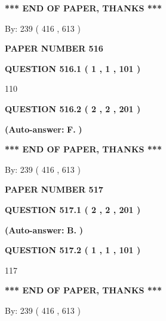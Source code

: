 \documentclass{ctexart}
\begin{document}
 
   
   
   
   
\vspace{1.0in} 
{\textbf{\large{ *** END OF PAPER, THANKS *** }}} 
   
   
\hspace{1.0in} By: 
 239 ( 416 ,  613 )
   
   
   
   
\newpage 
\setcounter{page}{ 
   516001 } 
   
   
 {\textbf{ \Large{ PAPER NUMBER  516  }}}
   
   
   
   
  
  
{\textbf{\large{QUESTION
516.1 
 ( 1 , 1 , 101 )
}}}

110
  
  
{\textbf{\large{QUESTION
516.2 
 ( 2 , 2 , 201 )
}}}
 
 
{\textbf{(Auto-answer:}}
{\textbf{\large{
F.}}}
{\textbf{)}}
 
 
   
   
   
   
\vspace{1.0in} 
{\textbf{\large{ *** END OF PAPER, THANKS *** }}} 
   
   
\hspace{1.0in} By: 
 239 ( 416 ,  613 )
   
   
   
   
\newpage 
\setcounter{page}{ 
   517001 } 
   
   
 {\textbf{ \Large{ PAPER NUMBER  517  }}}
   
   
   
   
  
  
{\textbf{\large{QUESTION
517.1 
 ( 2 , 2 , 201 )
}}}
 
 
{\textbf{(Auto-answer:}}
{\textbf{\large{
B.}}}
{\textbf{)}}
 
 
  
  
{\textbf{\large{QUESTION
517.2 
 ( 1 , 1 , 101 )
}}}

117
   
   
   
   
\vspace{1.0in} 
{\textbf{\large{ *** END OF PAPER, THANKS *** }}} 
   
   
\hspace{1.0in} By: 
 239 ( 416 ,  613 )
   
   
   
   
\newpage 
\setcounter{page}{ 
   518001 } 
   
\end{document}
